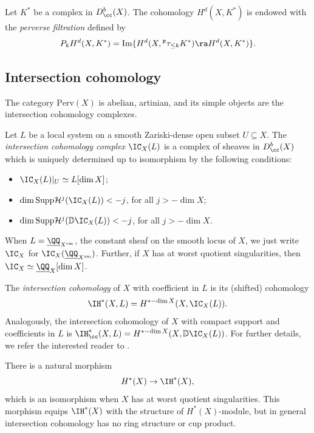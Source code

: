 \begin{defn}
Let $K^*$ be a complex in $D^b_{\cc}(X)$. The cohomology $H^d(X, K^*)$ is endowed with the \emph{perverse filtration} defined by
\[
P_k H^d(X, K^*) = \mathrm{Im} \{H^d(X,{^{\mathfrak{p}}}{\tau}_{\leq k}K^*)\ra H^d(X,K^*)\}.
\]
\end{defn}

\subsection{Intersection cohomology}\label{sec:intercohom}
The category $\mathrm{Perv}(X)$ is abelian, artinian, and its simple objects are the intersection cohomology complexes.

\begin{defn}
Let $L$ be a local system on a smooth Zariski-dense open subset $U\subseteq X$.
The \emph{intersection cohomology complex} $\IC_X(L)$ is a complex of sheaves in $D^b_{\cc}(X)$ which is uniquely determined up to isomorphism by the following conditions:
\begin{itemize}
	\item $\IC_{X}(L)|_{U}\simeq L[\dim X]$;
	\item $\dim \mathrm{Supp}\mathcal{H}^j(\IC_{X}(L))<-j$, for all $j>-\dim X$;
	\item $\dim\mathrm{Supp}\mathcal{H}^j(\mathbb{D}\IC_{X}(L))<-j$, for all $j>-\dim X$.
\end{itemize}
\end{defn}
When $L=\underline{\QQ}_{X^{\mathrm{sm}}}$, \ie the constant sheaf on the smooth locus of $X$, we just write $\IC_X$ for $\IC_X(\underline{\QQ}_{X^{\mathrm{sm}}})$. Further, if $X$ has at worst quotient singularities, then $\IC_X\simeq \underline{\QQ}_{X}[\dim X]$.

\begin{defn}
The \emph{intersection cohomology} of $X$ with coefficient in $L$ is its (shifted) cohomology
	\[
\IH^*(X,L)=H^{*-\dim X}(X,\IC_X(L)).
\]
Analogously, the intersection cohomology of $X$ with compact support and coefficients in $L$ is
	$\IH_{\cc}^*(X,L)=H^{*-\dim X}(X,\mathbb{D}\IC_X(L))$. For further details, we refer the interested reader to \cite{KW2006}.
	\end{defn}
	
There is a natural morphism
\[
H^*(X)\to \IH^*(X),
\]
which is an isomorphism when $X$ has at worst quotient singularities. This morphism equips $\IH^*(X)$ with the structure of $H^*(X)$-module, but in general intersection coho\-mology has no ring structure or cup product.

